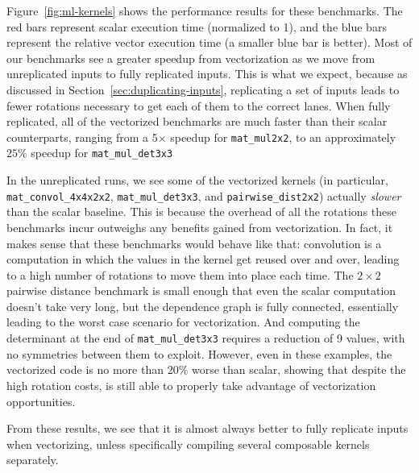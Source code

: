 Figure~\ref{fig:ml-kernels} shows the performance results for these benchmarks.
The red bars represent scalar execution time (normalized to 1), and the blue bars represent the relative vector execution time (a smaller blue bar is better).
Most of our benchmarks see a greater speedup from vectorization as we move from unreplicated inputs to fully replicated inputs.
This is what we expect, because as discussed in Section~\ref{sec:duplicating-inputs}, replicating a set of inputs leads to fewer rotations necessary to get each of them to the correct lanes.
When fully replicated, all of the vectorized benchmarks are much faster than their scalar counterparts, ranging from a 5$\times$ speedup for \texttt{mat\_mul2x2}, to an approximately $25\%$ speedup for \texttt{mat\_mul\_det3x3}

In the unreplicated runs, we see some of the vectorized kernels (in particular, \texttt{mat\_convol\_4x4x2x2}, \texttt{mat\_mul\_det3x3}, and \texttt{pairwise\_dist2x2}) actually {\em slower} than the scalar baseline.
This is because the overhead of all the rotations these benchmarks incur outweighs any benefits gained from vectorization.
In fact, it makes sense that these benchmarks would behave like that: convolution is a computation in which the values in the kernel get reused over and over, leading to a high number of rotations to move them into place each time.
The $2\times 2$ pairwise distance benchmark is small enough that even the scalar computation doesn't take very long, but the dependence graph is fully connected, essentially leading to the worst case scenario for vectorization.
And computing the determinant at the end of \texttt{mat\_mul\_det3x3} requires a reduction of 9 values, with no symmetries between them to exploit.
However, even in these examples, the vectorized code is no more than 20\% worse than scalar, showing that despite the high rotation costs, \system is still able to properly take advantage of vectorization opportunities.


From these results, we see that it is almost always better to fully replicate inputs when vectorizing, unless specifically compiling several composable kernels separately.